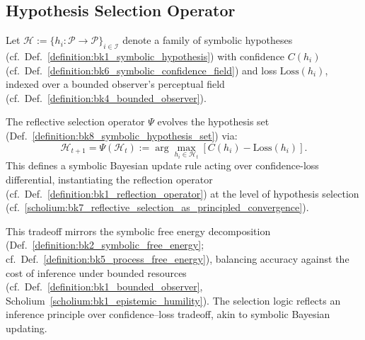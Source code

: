 \subsection{Hypothesis Selection Operator}
\label{sec:bk8_hypothesis_selection_operator}
\begin{definition}
\label{definition:bk8_symbolic_hypothesis_set}
Let \( \mathcal{H} := \{ h_i : \mathcal{P} \to \mathcal{P} \}_{i \in \mathcal{I}} \) denote a family of symbolic hypotheses (cf.~Def.~\ref{definition:bk1_symbolic_hypothesis}) with confidence \( C(h_i) \) (cf.~Def.~\ref{definition:bk6_symbolic_confidence_field}) and loss \( \mathrm{Loss}(h_i) \), indexed over a bounded observer's perceptual field (cf.~Def.~\ref{definition:bk4_bounded_observer}).
\end{definition}
\begin{definition}
\label{definition:bk8_reflective_selection_operator}
The reflective selection operator \( \Psi \) evolves the hypothesis set (Def.~\ref{definition:bk8_symbolic_hypothesis_set}) via:
\[
\mathcal{H}_{t+1} = \Psi(\mathcal{H}_t) := \arg\max_{h_i \in \mathcal{H}_t} \left[ C(h_i) - \mathrm{Loss}(h_i) \right].
\]
This defines a symbolic Bayesian update rule acting over confidence-loss differential, instantiating the reflection operator (cf.~Def.~\ref{definition:bk1_reflection_operator}) at the level of hypothesis selection (cf.~\ref{scholium:bk7_reflective_selection_as_principled_convergence}).
\end{definition}
\begin{remark}
\label{remark:bk8_inference_principle_over_confidence_loss_tradeoff}
This tradeoff mirrors the symbolic free energy decomposition (Def.~\ref{definition:bk2_symbolic_free_energy}; cf.~Def.~\ref{definition:bk5_process_free_energy}), balancing accuracy against the cost of inference under bounded resources (cf.~Def.~\ref{definition:bk1_bounded_observer}, Scholium~\ref{scholium:bk1_epistemic_humility}).
The selection logic reflects an inference principle over confidence–loss tradeoff, akin to symbolic Bayesian updating.
\end{remark}
